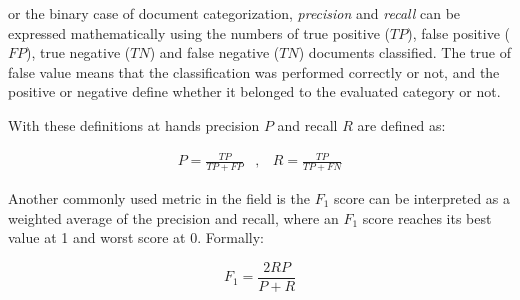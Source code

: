 or the binary case of document categorization, \textit{precision}  and \textit{recall}
can be expressed mathematically using the numbers of true positive ($TP$), false positive
($FP$), true negative ($TN$) and false negative ($TN$) documents
classified. The true of false value means that the classification
was performed correctly or not, and the positive or negative define
whether it belonged to the evaluated category or not. 

With these definitions  at hands precision $P$ and recall $R$ are defined as:


\begin{eqnarray}
P=\frac{TP}{TP+FP} & ,\, & R=\frac{TP}{TP+FN}\end{eqnarray}

Another commonly used metric in the field is the  $F_1$ score can be
interpreted as a weighted average of the precision and recall, where an $F_1$
score reaches its best value at 1 and worst score at 0. Formally:

\begin{equation}
  F_1=\frac{2RP}{P+R}
\end{equation}




